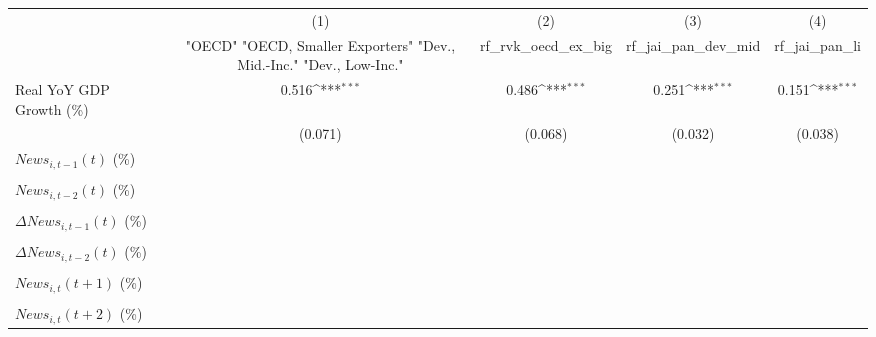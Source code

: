 {
\def\sym#1{\ifmmode^{#1}\else\(^{#1}\)\fi}
\begin{tabular}{l*{4}{c}}
\toprule
                    &\multicolumn{1}{c}{(1)}&\multicolumn{1}{c}{(2)}&\multicolumn{1}{c}{(3)}&\multicolumn{1}{c}{(4)}\\
                    &\multicolumn{1}{c}{ "OECD" "OECD, Smaller Exporters" "Dev., Mid.-Inc." "Dev., Low-Inc."}&\multicolumn{1}{c}{rf_rvk_oecd_ex_big}&\multicolumn{1}{c}{rf_jai_pan_dev_mid}&\multicolumn{1}{c}{rf_jai_pan_li}\\
\midrule
Real YoY GDP Growth (\%)&       0.516\sym{***}&       0.486\sym{***}&       0.251\sym{***}&       0.151\sym{***}\\
                    &     (0.071)         &     (0.068)         &     (0.032)         &     (0.038)         \\
\addlinespace
$ News_{i,t-1}(t)$ (\%)&                     &                     &                     &                     \\
                    &                     &                     &                     &                     \\
\addlinespace
$ News_{i,t-2}(t)$ (\%)&                     &                     &                     &                     \\
                    &                     &                     &                     &                     \\
\addlinespace
$ \Delta News_{i,t-1}(t)$ (\%)&                     &                     &                     &                     \\
                    &                     &                     &                     &                     \\
\addlinespace
$ \Delta News_{i,t-2}(t)$ (\%)&                     &                     &                     &                     \\
                    &                     &                     &                     &                     \\
\addlinespace
$ News_{i,t}(t+1)$ (\%)&                     &                     &                     &                     \\
                    &                     &                     &                     &                     \\
\addlinespace
$ News_{i,t}(t+2)$ (\%)&                     &                     &                     &                     \\

\end{tabular}}
